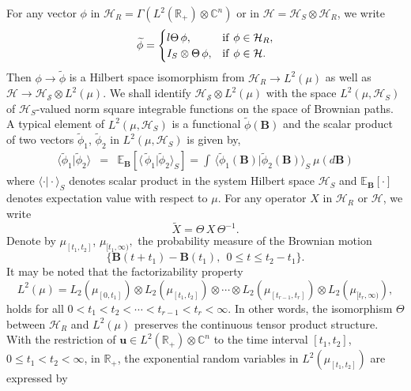 For any vector $\phi$ in $\mathcal{H}_R=\Gamma(L^2(\mathbb{R}_+)\otimes\mathbb{C}^n)$ or in 
$\mathcal{H}=\mathcal{H}_S\otimes\mathcal{H}_R$, we write 
\begin{eqnarray} 
\widetilde{\phi}=
\begin{cases}
{l} \Theta\, \phi, & {\rm if}\ \phi\in \mathcal{H}_R, \\ 
I_{S}\otimes \Theta\, \phi , & {\rm if}\  \phi\in \mathcal{H}.
\end{cases}  \label{chap5-eq5.2}
\end{eqnarray}
Then $\phi\rightarrow \widetilde{\phi}$ is a Hilbert space isomorphism from $\mathcal{H}_R \rightarrow L^2(\mu)$  as well as  $\mathcal{H}\rightarrow \mathcal{H_S}\otimes L^2(\mu)$.  We shall identify $\mathcal{H_S}\otimes L^2(\mu)$ with the space $L^2(\mu,\mathcal{H}_S)$ of $\mathcal{H}_S$-valued norm square integrable functions on the space of Brownian paths.  A typical element of $L^2(\mu,\mathcal{H}_S)$ is a functional $\widetilde{\phi}(\mathbf{B})$ and the scalar product of two vectors $\widetilde{\phi}_1$, $\widetilde{\phi}_2$ in $L^2(\mu,\mathcal{H}_S)$ is given by, 
\begin{eqnarray} 
\langle \widetilde{\phi}_1\vert \widetilde{\phi}_2\rangle &=& \mathbb{E}_{\mathbf{B}}[\langle\,  \widetilde{\phi}_1\vert \widetilde{\phi}_2\rangle_S]
=\int\, \langle \widetilde{\phi}_1(\mathbf{B})\vert \widetilde{\phi}_2(\mathbf{B})\rangle_S\ 
\mu(d\mathbf{B})\label{chap5-eq5.3}
\end{eqnarray}  
where $\langle \cdot \vert \cdot \rangle_S$ denotes scalar product in the system Hilbert space $\mathcal{H}_S$ and $\mathbb{E}_{\mathbf{B}}[\cdot ]$ denotes  expectation value with respect to  $\mu$.  For any operator $X$ in $\mathcal{H}_R$ or $\mathcal{H}$, we write 
$$
\widetilde{X}=\Theta\, X\, \Theta^{-1}.
$$ 
Denote by $\mu_{[t_1,t_2]}$, $\mu_{[t_1,\infty)},$  the probability measure of the Brownian motion
$$
\{\mathbf{B}(t+t_1)-\mathbf{B}(t_1),\ \ 0\leq t\leq t_2-t_1\}.
$$  
It may be noted that the factorizability property 
\begin{equation} 
L^2(\mu)=L_2(\mu_{[0,t_1]})\otimes L_2(\mu_{[t_1,t_2]})\otimes \cdots \otimes L_2(\mu_{[t_{r-1},t_r]})\otimes L_2(\mu_{[t_r,\infty)}), \label{chap5-eq5.4}
\end{equation} 
holds for all $0< t_1 <t_2 <\cdots <t_{r-1}< t_r < \infty$.  In other words, the  isomorphism $\Theta$ between $\mathcal{H}_R$ and $L^2(\mu)$ preserves the continuous tensor product structure. With the restriction of $\mathbf{u}\in L^2(\mathbb{R}_+)\otimes\mathbb{C}^n$ to the time interval  $[t_1, t_2]$,  $0\leq t_1 <t_2 <\infty$, in $\mathbb{R}_+$, the exponential random variables in $L^2(\mu_{[t_1,t_2]})$ are expressed by   

